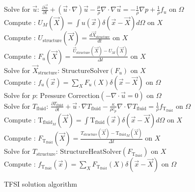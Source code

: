 \documentclass[10pt]{article} %
\begin{document}
\begin{algorithm}[H]
	\SetAlgoLined
	{
		{
			Solve for $\vec{u}$: $\frac{\partial \vec{u}}{\partial t} + (\vec{u} \cdot \nabla) \vec{u} - \frac{\mu}{\rho} \nabla \cdot \nabla \vec{u} = - \frac{1}{\rho} \nabla p + \frac{1}{\rho}f_u$ \quad on $\Omega$\\
			Compute : $U_M (\vec{X}) = \int u(\vec{x}) \delta(\vec{x}-\vec{X}) d \Omega$ \quad on $X$\\
			Compute : $U_{\text{structure}} (\vec{X}) = \frac{d \vec{X}_{\text{structure}}}{dt}$ \quad on $X$\\
			Compute : $F_u (\vec{X}) = \frac{\vec{U}_\text{structure} (\vec{X}) - U_M(\vec{X})}{\Delta t}$ \quad on $X$\\
			Solve for $\vec{X}_\text{structure}$: $\text{StructureSolver}(F_u)$ \quad on $X$\\
			Compute : $f_u (\vec{x}) = \sum_{X} F_u (X) \delta (\vec{x}-\vec{X})$ \quad on $\Omega$\\
			Solve for $p$: $\text{Pressure Correction}(- \nabla \cdot \vec{u} = 0)$ \quad on $\Omega$\\
		}
		{
			Solve for $T_{\text{fluid}}$: $\frac{\partial T_{\text{fluid}}}{\partial t} + \vec{u} \cdot \nabla T_{\text{fluid}} - \frac{\kappa}{\rho c_p} \nabla \cdot \nabla T_{\text{fluid}} = \frac{1}{\rho} f_{\text{T}_{\text{fluid}}}$ \quad on $\Omega$\\
			Compute : $\text{T}_{\text{fluid}_M} (\vec{X}) = \int {\text{T}_{\text{fluid}}}(\vec{x}) \delta(\vec{x}-\vec{X}) d \Omega$  \quad on $X$\\
			Compute : $F_{\text{T}_{\text{fluid}}} (\vec{X}) = \frac{T_{\text{structure}} (\vec{X}) - {\text{T}_{\text{fluid}}}_M(\vec{X})}{\Delta t}$ \quad on $X$\\
			Solve for $T_\text{structure}$: $\text{StructureHeatSolver}(F_{\text{T}_{\text{fluid}}})$ \quad on $X$\\
			Compute : $f_{\text{T}_{\text{fluid}}} (\vec{x}) = \sum_{X} F_{\text{T}_{\text{fluid}}} (X) \delta (\vec{x}-\vec{X})$ \quad on $\Omega$\\
		}
	}
	\caption{TFSI solution algorithm}
\end{algorithm}
\end{document}
